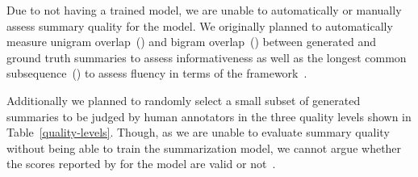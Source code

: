 Due to not having a trained model, we are unable to automatically or manually assess summary quality for the \BertSumAbs model.
We originally planned to automatically measure unigram overlap~() and bigram overlap~() between generated and ground truth summaries to assess informativeness as well as the longest common subsequence~(\RougeL) to assess fluency in terms of the \Rouge framework~\cite{Lin2004}.

Additionally we planned to randomly select a small subset of generated summaries to be judged by human annotators in the three quality levels shown in Table~\ref{quality-levels}.
Though, as we are unable to evaluate summary quality without being able to train the summarization model, we cannot argue whether the \Rouge scores reported by \citeauthor{LiuL2019} for the \BertSumAbs model are valid or not~\cite{LiuL2019}.
